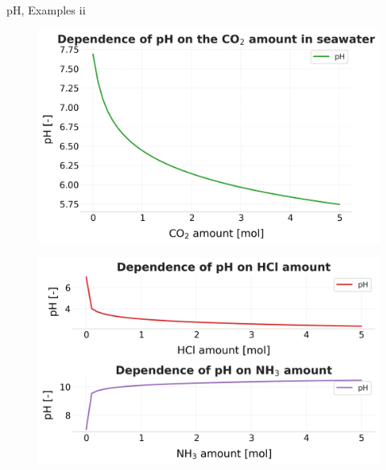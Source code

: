 \begin{frame}{pH, Examples \; ii}
\begin{itemize}
\end{itemize}
%
\rcol
\begin{figure}
\centering
\includegraphics[width=0.82\columnwidth]{figures/chemical-equilibrium/ph-dependence-on-co2-amount-in-seawater.png}
\end{figure}
\vskip -10pt
\begin{figure}
\centering
\includegraphics[width=0.82\columnwidth]{figures/chemical-equilibrium/ph-dependence-on-contaminants-in-water.png}
\end{figure}
\ecol

\end{frame}




